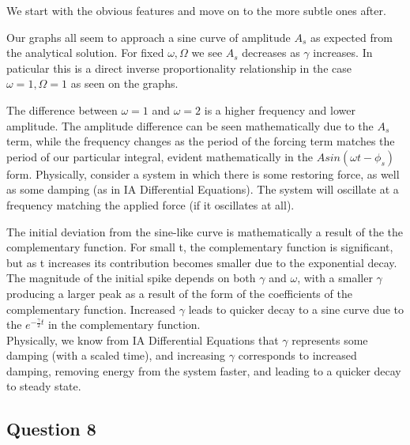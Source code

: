 \documentclass[10pt,a4paper]{report}
\begin{document}
We start with the obvious features and move on to the more subtle ones after. \par
\vspace{5mm}
Our graphs all seem to approach a sine curve of amplitude $A_s$ as expected from the analytical solution. For fixed $\omega, \Omega$ we see $A_s$ decreases as $\gamma$ increases. In paticular this is a direct inverse proportionality relationship in the case $\omega=1, \Omega=1$ as seen on the graphs.\par
\vspace{5mm}
The difference between $\omega=1$ and $\omega=2$ is a higher frequency and lower amplitude. The amplitude difference can be seen mathematically due to the $A_s$ term, while the frequency changes as the period of the forcing term matches the period of our particular integral, evident mathematically in the $Asin(\omega t-\phi_s)$ form. Physically, consider a system in which there is some restoring force, as well as some damping (as in IA Differential Equations). The system will oscillate at a frequency matching the applied force (if it oscillates at all).\par
\vspace{5mm}
The initial deviation from the sine-like curve is mathematically a result of the the complementary function. For small t, the complementary function is significant, but as t increases its contribution becomes smaller due to the exponential decay. The magnitude of the initial spike depends on both $\gamma$ and $\omega$, with a smaller $\gamma$ producing a larger peak as a result of the form of the coefficients of the complementary function.  Increased $\gamma$ leads to quicker decay to a sine curve due to the $e^{-\frac{\gamma}{2}t}$ in the complementary function. \\


Physically, we know from IA Differential Equations that $\gamma$ represents some damping (with a scaled time), and increasing $\gamma$ corresponds to  increased damping, removing energy from the system faster, and leading to a quicker decay to steady state. \par

\newpage

\subsection*{Question 8}
\end{document}
